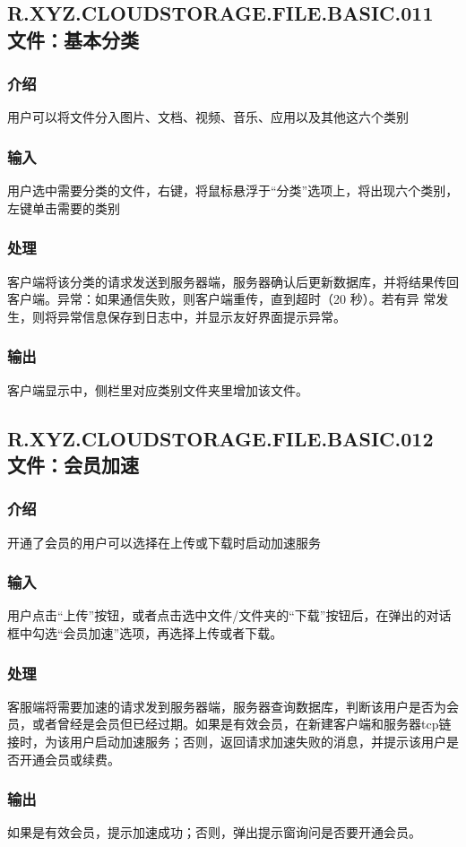 {\color{red}
\subsection{R.XYZ.CLOUDSTORAGE.FILE.BASIC.011 文件：基本分类}

\subsubsection{介绍}
用户可以将文件分入图片、文档、视频、音乐、应用以及其他这六个类别

\subsubsection{输入}
用户选中需要分类的文件，右键，将鼠标悬浮于“分类”选项上，将出现六个类别，左键单击需要的类别

\subsubsection{处理}
客户端将该分类的请求发送到服务器端，服务器确认后更新数据库，并将结果传回客户端。异常：如果通信失败，则客户端重传，直到超时（20 秒）。若有异 常发⽣，则将异常信息保存到⽇志中，并显⽰友好界⾯提⽰异常。

\subsubsection{输出}
客户端显⽰中，侧栏里对应类别文件夹里增加该文件。

\subsection{R.XYZ.CLOUDSTORAGE.FILE.BASIC.012 文件：会员加速}

\subsubsection{介绍}
开通了会员的用户可以选择在上传或下载时启动加速服务

\subsubsection{输入}
⽤户点击“上传”按钮，或者点击选中文件/文件夹的“下载”按钮后，在弹出的对话框中勾选“会员加速”选项，再选择上传或者下载。

\subsubsection{处理}
客服端将需要加速的请求发到服务器端，服务器查询数据库，判断该用户是否为会员，或者曾经是会员但已经过期。如果是有效会员，在新建客户端和服务器tcp链接时，为该用户启动加速服务；否则，返回请求加速失败的消息，并提示该用户是否开通会员或续费。

\subsubsection{输出}
如果是有效会员，提示加速成功；否则，弹出提示窗询问是否要开通会员。

}

